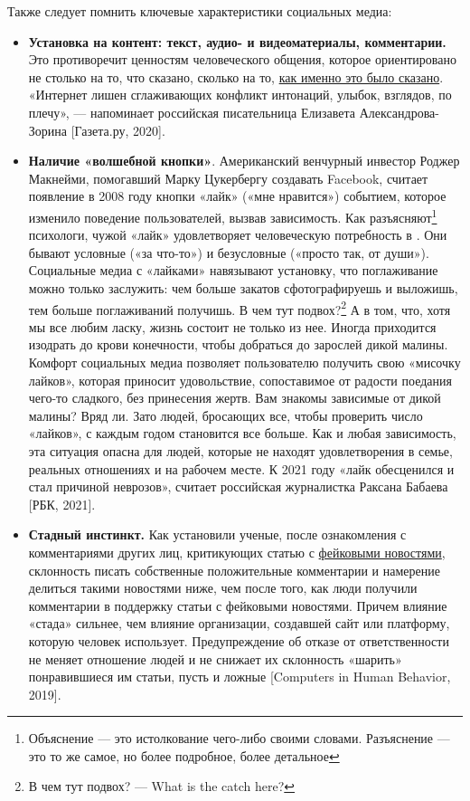 Также следует помнить ключевые характеристики социальных медиа:
\begin{itemize}[noitemsep, label=--]
    \item \textbf{Установка на контент: текст, аудио- и видеоматериалы, комментарии.} Это противоречит ценностям человеческого общения, которое ориентировано не столько на то, что сказано, сколько на то, \href{https://4brain.ru/blog/neverbalnoe-obschenie-o-chem-govorit-yazyk-tela/}{как именно это было сказано}. «Интернет лишен сглаживающих конфликт интонаций, улыбок, взглядов,  по плечу», --- напоминает российская писательница Елизавета Александрова-Зорина [Газета.ру, 2020].
    \item \textbf{Наличие «волшебной кнопки»}. Американский венчурный инвестор Роджер Макнейми, помогавший Марку Цукербергу создавать Facebook, считает появление в 2008 году кнопки «лайк» («мне нравится») событием, которое изменило поведение пользователей, вызвав зависимость. Как разъясняют\footnote{Объяснение --- это истолкование чего-либо своими словами. Разъяснение --- это то же самое, но более подробное, более детальное} психологи, чужой «лайк» удовлетворяет человеческую потребность в . Они бывают условные («за что-то») и безусловные («просто так, от души»). Социальные медиа с «лайками» навязывают установку, что поглаживание можно только заслужить: чем больше закатов сфотографируешь и выложишь, тем больше поглаживаний получишь. В чем тут подвох?\footnote{В чем тут подвох? --- What is the catch here?} А в том, что, хотя мы все любим ласку, жизнь состоит не только из нее. Иногда приходится изодрать до крови конечности, чтобы добраться до зарослей дикой малины. Комфорт социальных медиа позволяет пользователю получить свою «мисочку лайков», которая приносит удовольствие, сопоставимое от радости поедания чего-то сладкого, без принесения жертв. Вам знакомы зависимые от дикой малины? Вряд ли. Зато людей, бросающих все, чтобы проверить число «лайков», с каждым годом становится все больше. Как и любая зависимость, эта ситуация опасна для людей, которые не находят удовлетворения в семье, реальных отношениях и на рабочем месте. К 2021 году «лайк обесценился и стал причиной неврозов», считает российская журналистка Раксана Бабаева [РБК, 2021].
    \item \textbf{Стадный инстинкт.} Как установили ученые, после ознакомления с комментариями других лиц, критикующих статью с \href{https://4brain.ru/blog/kak-otlichit-fejk-ot-pravdy-instrukciya-na-vse-sluchai-zhizni/}{фейковыми новостями}, склонность писать собственные положительные комментарии и намерение делиться такими новостями ниже, чем после того, как люди получили комментарии в поддержку статьи с фейковыми новостями. Причем влияние «стада» сильнее, чем влияние организации, создавшей сайт или платформу, которую человек использует. Предупреждение об отказе от ответственности не меняет отношение людей и не снижает их склонность «шарить» понравившиеся им статьи, пусть и ложные [Computers in Human Behavior, 2019].
\end{itemize}

